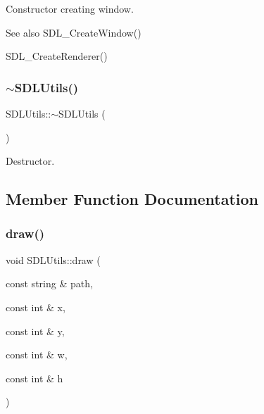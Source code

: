 Constructor creating window. 

\begin{DoxySeeAlso}{See also}
S\+D\+L\+\_\+\+Create\+Window() 

S\+D\+L\+\_\+\+Create\+Renderer() 
\end{DoxySeeAlso}
\mbox{\label{class_s_d_l_utils_a4530f05f7fdf2495a63ff1e9fc553680}} 
\subsubsection{\texorpdfstring{$\sim$\+S\+D\+L\+Utils()}{~SDLUtils()}}
{\footnotesize\ttfamily S\+D\+L\+Utils\+::$\sim$\+S\+D\+L\+Utils (\begin{DoxyParamCaption}{ }\end{DoxyParamCaption})\hspace{0.3cm}{\ttfamily [inline]}}



Destructor. 



\subsection{Member Function Documentation}
\mbox{\label{class_s_d_l_utils_ae7645c69b8b5104833729bec7f44163b}} 
\subsubsection{\texorpdfstring{draw()}{draw()}\hspace{0.1cm}{\footnotesize\ttfamily [1/6]}}
{\footnotesize\ttfamily void S\+D\+L\+Utils\+::draw (\begin{DoxyParamCaption}\item[{const string \&}]{path,  }\item[{const int \&}]{x,  }\item[{const int \&}]{y,  }\item[{const int \&}]{w,  }\item[{const int \&}]{h }\end{DoxyParamCaption})\hspace{0.3cm}{\ttfamily [inline]}}



